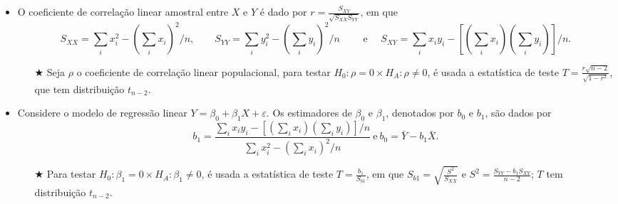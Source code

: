 \documentclass[10pt]{article}%
\begin{document}
\begin{itemize}
\item O coeficiente de correlação linear amostral entre $X$ e $Y$ é dado por $\displaystyle{r = \frac{S_{XY}}{\sqrt{S_{XX}S_{YY}}}}$, em que 
$$
S_{XX} = \sum_i{x_i^2} - (\sum_i{x_i})^2/n, \qquad S_{YY} = \sum_i{y_i^2} - (\sum_i{y_i})^2/n \qquad \mbox{ e } \quad  S_{XY} = \sum_i{x_iy_i} - [(\sum_i{x_i})(\sum_i{y_i})]/n.
$$
\begin{itemize}
\item[$\bigstar$] Seja $\rho$ o coeficiente de correlação linear populacional, para testar $H_0: \rho = 0 \times H_A: \rho \neq 0$, é usada a estatística de teste $T = \frac{r\sqrt{n - 2}}{\sqrt{1 - r^2}}$, que tem distribuição $t_{n-2}$.
\end{itemize}
\item Considere o modelo de regressão linear $Y = \beta_0 + \beta_1 X + \varepsilon$. Os estimadores de $\beta_0$ e $\beta_1$, denotados por $b_0$ e $b_1$, são dados por
$$
b_1 = \frac{\sum_i{x_iy_i} - [(\sum_i{x_i})(\sum_i{y_i})]/n}{\sum_i{x_i^2} - (\sum_i{x_i})^2/n}\ \mbox{e}\ b_0 = \bar{Y} - b_1\bar{X}.
$$
\begin{itemize}
\item[$\bigstar$] Para testar $H_0: \beta_1 = 0 \times H_A: \beta_1 \neq 0$, é usada a estatística de teste $T = \frac{b_1}{S_{b1}}$, em que $S_{b1} = \sqrt{\frac{S^2}{S_{XX}}}$ e $S^2 = \frac{S_{YY} - b_1S_{XY}}{n - 2}$; $T$ tem distribuição $t_{n-2}$.
\end{itemize}
\end{itemize}
\end{document}
